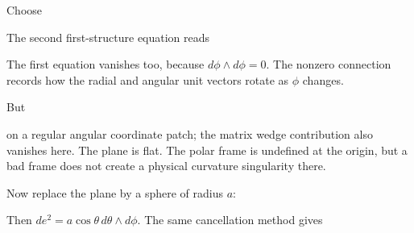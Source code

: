 \documentclass[
  11pt,
  letterpaper,
  oneside,
  openany]{scrbook}
\begin{document}
Choose

\begin{center}
\begingroup
{}
\ifdim\wd\grmathbox>\linewidth
\resizebox{\linewidth}{!}{\usebox{\grmathbox}}
\else\usebox{\grmathbox}\fi
\endgroup
\end{center}

The second first-structure equation reads

\begin{center}
\begingroup
{}
\ifdim\wd\grmathbox>\linewidth
\resizebox{\linewidth}{!}{\usebox{\grmathbox}}
\else\usebox{\grmathbox}\fi
\endgroup
\end{center}

The first equation vanishes too, because \(d\phi\wedge d\phi=0\). The
nonzero connection records how the radial and angular unit vectors
rotate as \(\phi\) changes.

But

\begin{center}
\begingroup
{}
\ifdim\wd\grmathbox>\linewidth
\resizebox{\linewidth}{!}{\usebox{\grmathbox}}
\else\usebox{\grmathbox}\fi
\endgroup
\end{center}

on a regular angular coordinate patch; the matrix wedge contribution
also vanishes here. The plane is flat. The polar frame is undefined at
the origin, but a bad frame does not create a physical curvature
singularity there.

Now replace the plane by a sphere of radius \(a\):

\begin{center}
\begingroup
{}
\ifdim\wd\grmathbox>\linewidth
\resizebox{\linewidth}{!}{\usebox{\grmathbox}}
\else\usebox{\grmathbox}\fi
\endgroup
\end{center}

Then \(de^2=a\cos\theta\,d\theta\wedge d\phi\). The same cancellation
method gives

\begin{center}
\begingroup
{}
\ifdim\wd\grmathbox>\linewidth
\resizebox{\linewidth}{!}{\usebox{\grmathbox}}
\else\usebox{\grmathbox}\fi
\endgroup
\end{center}
\end{document}
